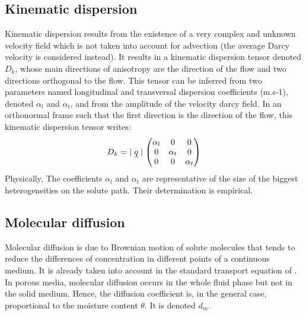 \subsection{Kinematic dispersion}
%
Kinematic dispersion results from the existence of a very complex and unknown velocity field which is
not taken into account for advection (the average Darcy velocity is considered instead).
It results in a kinematic dispersion tensor denoted $D_k$, whose main directions of anisotropy are the direction of the flow and
two directions orthogonal to the flow. This tensor can be inferred from two parameters named longitudinal and transversal dispersion coefficients (m.s-1),
denoted $\alpha_l$ and $\alpha_t$, and from the amplitude of the velocity darcy field.
In an orthonormal frame such that the first direction is the direction of the flow, this
kinematic dispersion tensor writes:
\begin{equation}
\label{eq:groundwater:dispersion_tensor}
D_k = \ \mid \underline{q} \mid
\begin{pmatrix}
\alpha_l & 0 & 0 \\
0 & \alpha_t & 0 \\
0 & 0 & \alpha_t
\end{pmatrix}
\end{equation}
Physically, The coefficients $\alpha_l$ and $\alpha_t$ are representative of the size of the biggest heterogeneities on the solute path. Their
determination is empirical.

\subsection{Molecular diffusion}
Molecular diffusion is due to Brownian motion of solute molecules that tends to reduce the differences
of concentration in different points of a continuous medium.
It is already taken into account in the standard transport equation of \CS.
In porous media, molecular diffusion occurs in the whole fluid phase but not in the solid medium. Hence, the diffusion coefficient
is, in the general case, proportional to the moisture content $\theta$. It is denoted $d_m$.

